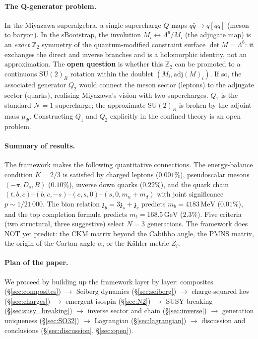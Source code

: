 \documentclass[aps,prd,twocolumn,showpacs,preprintnumbers,superscriptaddress,floatfix]{revtex4-2}
\newcommand{\SU}{\mathrm{SU}}
\newcommand{\adj}{\mathrm{adj}}
\newcommand{\MeV}{\,\mathrm{MeV}}
\newcommand{\GeV}{\,\mathrm{GeV}}
\newcommand{\zch}{\mathfrak{z}}
\begin{document}
\paragraph{The Q-generator problem.}
In the Miyazawa superalgebra, a single supercharge $Q$ maps
$q\bar{q} \to q[qq]$ (meson to baryon).
In the sBootstrap, the involution $M_i \leftrightarrow
\Lambda^6/M_i$ (the adjugate map) is an \emph{exact}
$\mathbb{Z}_2$ symmetry of the quantum-modified constraint
surface $\det M = \Lambda^6$: it exchanges the direct and
inverse branches and is a holomorphic identity, not an
approximation.
The \textbf{open question} is whether this $\mathbb{Z}_2$ can
be promoted to a continuous $\SU(2)_R$ rotation within the
doublet $(M_i, \adj(M)_i)$.
If so, the associated generator $Q_2$ would connect the meson
sector (leptons) to the adjugate sector (quarks), realising
Miyazawa's vision with two supercharges.
$Q_1$ is the standard $\mathcal{N}{=}1$ supercharge; the
approximate $\SU(2)_R$ is broken by the adjoint mass $\mu_\Phi$.
Constructing $Q_1$ and $Q_2$ explicitly in the confined theory
is an open problem.

\paragraph{Summary of results.}
The framework makes the following quantitative connections.
The energy-balance condition $K = 2/3$ is satisfied by
charged leptons ($0.001\%$), pseudoscalar mesons $(-\pi, D_s, B)$
($0.10\%$), inverse down quarks ($0.22\%$), and the quark chain
$(t,b,c)$--$(b,c,-s)$--$(c,s,0)$--$(s,0,m_u{+}m_d)$ with joint
significance $p \sim 1/21\,000$.
The bion relation $\zch_b = 3\zch_s + \zch_c$ predicts
$m_b = 4183\MeV$ ($0.01\%$), and the top completion formula
predicts $m_t = 168.5\GeV$ ($2.3\%$).
Five criteria (two structural, three suggestive) select
$N = 3$ generations.
The framework does NOT yet predict: the CKM matrix beyond the
Cabibbo angle, the PMNS matrix, the origin of the Cartan angle
$\alpha$, or the K\"ahler metric $Z_i$.

\paragraph{Plan of the paper.}
We proceed by building up the framework layer by layer:
composites (\S\ref{sec:composites}) $\to$
Seiberg dynamics (\S\ref{sec:seiberg}) $\to$
charge-squared law (\S\ref{sec:charges}) $\to$
emergent isospin (\S\ref{sec:N2}) $\to$
SUSY breaking (\S\ref{sec:susy_breaking}) $\to$
inverse sector and chain (\S\ref{sec:inverse}) $\to$
generation uniqueness (\S\ref{sec:SO32}) $\to$
Lagrangian (\S\ref{sec:lagrangian}) $\to$
discussion and conclusions (\S\ref{sec:discussion},
\S\ref{sec:open}).
\end{document}
